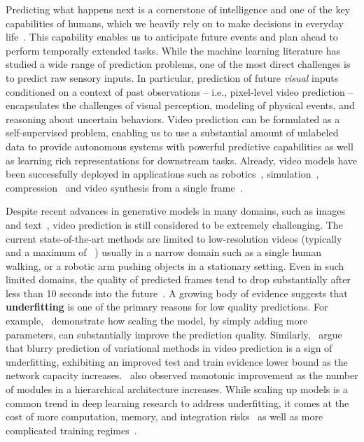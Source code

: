 \documentclass{article}
\begin{document}
Predicting what happens next is a cornerstone of intelligence and one of the key capabilities of humans, which we heavily rely on to make decisions in everyday life~\cite{bubic2010prediction}. This capability enables us to anticipate future events and plan ahead to perform temporally extended tasks. While the machine learning literature has studied a wide range of prediction problems, one of the most direct challenges is to predict raw sensory inputs. In particular, prediction of future \emph{visual} inputs conditioned on a context of past observations -- i.e., pixel-level video prediction -- encapsulates the challenges of visual perception, modeling of physical events, and reasoning about uncertain behaviors. Video prediction can be formulated as a self-supervised problem, enabling us to use a substantial amount of unlabeled data to provide autonomous systems with powerful predictive capabilities as well as learning rich representations for downstream tasks. Already, video models have been successfully deployed in applications such as robotics~\cite{finn2017deep, zhang2019solar}, simulation~\cite{drivegan, kim2020learning}, compression~\cite{duan2020video, sulun2021can} and video synthesis from a single frame~\cite{endo2019animating, nam2019end}.

Despite recent advances in generative models in many domains, such as images~\cite{karras2017progressive, vahdat2020nvae} and text~\cite{devlin2018bert, brown2020language}, video prediction is still considered to be extremely challenging. The current state-of-the-art methods are limited to low-resolution videos (typically ~\cite{villegas2019high} and a maximum of ~\cite{drivegan}) usually in a narrow domain such as a single human walking, or a robotic arm pushing objects in a stationary setting. Even in such limited domains, the quality of predicted frames tend to drop substantially after less than 10 seconds into the future~\cite{saxena2021clockwork}. A growing body of evidence suggests that \textbf{underfitting} is one of the primary reasons for low quality predictions. For example,~\citet{villegas2019high} demonstrate how scaling the model, by simply adding more parameters, can substantially improve the prediction quality. Similarly,~\citet{castrejon2019improved} argue that blurry prediction of variational methods in video prediction is a sign of underfitting, exhibiting an improved test and train evidence lower bound as the network capacity increases.~\citet{wu2021greedy} also observed monotonic improvement as the number of modules in a hierarchical architecture increases. While scaling up models is a common trend in deep learning research to address underfitting, it comes at the cost of more computation, memory, and integration risks~\cite{wolf2019huggingface} as well as more complicated training regimes~\cite{wu2021greedy}. 
\end{document}
